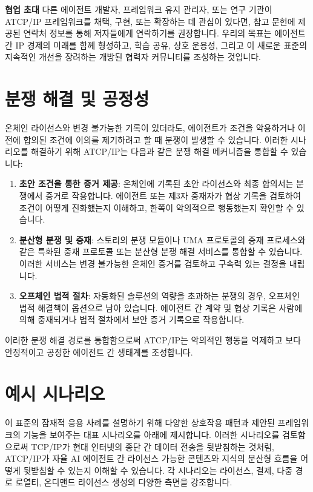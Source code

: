 \documentclass[journal,onecolumn]{IEEEtran} %
\begin{document}
\noindent\textbf{협업 초대}
다른 에이전트 개발자, 프레임워크 유지 관리자, 또는 연구 기관이 ATCP/IP 프레임워크를 채택, 구현, 또는 확장하는 데 관심이 있다면, 참고 문헌에 제공된 연락처 정보를 통해 저자들에게 연락하기를 권장합니다. 우리의 목표는 에이전트 간 IP 경제의 미래를 함께 형성하고, 학습 공유, 상호 운용성, 그리고 이 새로운 표준의 지속적인 개선을 장려하는 개방된 협력자 커뮤니티를 조성하는 것입니다.

\section{분쟁 해결 및 공정성}
온체인 라이선스와 변경 불가능한 기록이 있더라도, 에이전트가 조건을 악용하거나 이전에 합의된 조건에 이의를 제기하려고 할 때 분쟁이 발생할 수 있습니다. 이러한 시나리오를 해결하기 위해 ATCP/IP는 다음과 같은 분쟁 해결 메커니즘을 통합할 수 있습니다:

\begin{enumerate}
    \item \textbf{초안 조건을 통한 증거 제공}: 온체인에 기록된 초안 라이선스와 최종 합의서는 분쟁에서 증거로 작용합니다. 에이전트 또는 제3자 중재자가 협상 기록을 검토하여 조건이 어떻게 진화했는지 이해하고, 한쪽이 악의적으로 행동했는지 확인할 수 있습니다.
    \item \textbf{분산형 분쟁 및 중재}: 스토리의 분쟁 모듈\cite{ref11}이나 UMA 프로토콜의 중재 프로세스와 같은 특화된 중재 프로토콜 또는 분산형 분쟁 해결 서비스를 통합할 수 있습니다. 이러한 서비스는 변경 불가능한 온체인 증거를 검토하고 구속력 있는 결정을 내립니다.
    \item \textbf{오프체인 법적 절차}: 자동화된 솔루션의 역량을 초과하는 분쟁의 경우, 오프체인 법적 해결책이 옵션으로 남아 있습니다. 에이전트 간 계약 및 협상 기록은 사람에 의해 중재되거나 법적 절차에서 보안 증거 기록으로 작용합니다.
\end{enumerate}

이러한 분쟁 해결 경로를 통합함으로써 ATCP/IP는 악의적인 행동을 억제하고 보다 안정적이고 공정한 에이전트 간 생태계를 조성합니다.

\section{예시 시나리오}
이 표준의 잠재적 응용 사례를 설명하기 위해 다양한 상호작용 패턴과 제안된 프레임워크의 기능을 보여주는 대표 시나리오를 아래에 제시합니다. 이러한 시나리오를 검토함으로써 TCP/IP가 현대 인터넷의 종단 간 데이터 전송을 뒷받침하는 것처럼, ATCP/IP가 자율 AI 에이전트 간 라이선스 가능한 콘텐츠와 지식의 분산형 흐름을 어떻게 뒷받침할 수 있는지 이해할 수 있습니다. 각 시나리오는 라이선스, 결제, 다중 경로 로열티, 온디맨드 라이선스 생성의 다양한 측면을 강조합니다.
\end{document}
